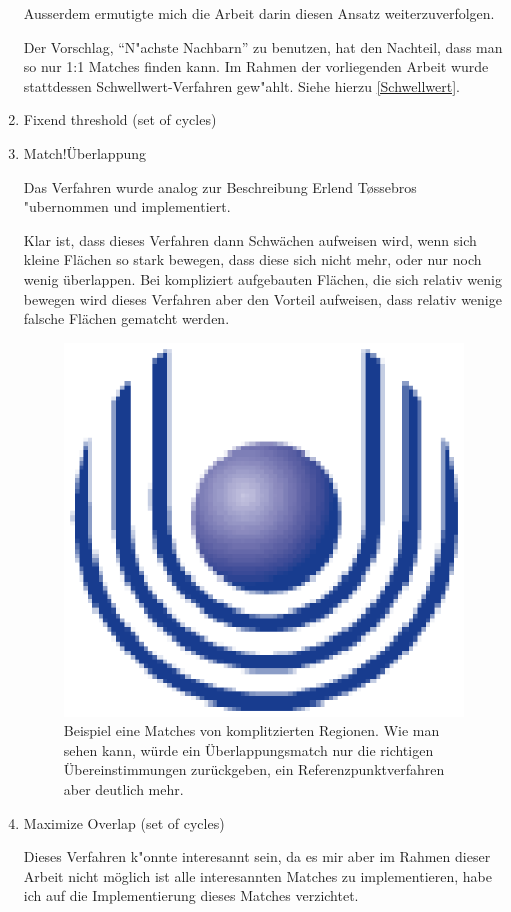 \begin{enumerate}
Ausserdem ermutigte mich die Arbeit \cite{AFRW} darin diesen Ansatz weiterzuverfolgen.

Der Vorschlag, "`N"achste Nachbarn"' zu benutzen, hat den Nachteil, dass man so nur 1:1 Matches finden kann. Im Rahmen der vorliegenden Arbeit wurde stattdessen Schwellwert-Verfahren gew"ahlt. Siehe hierzu \ref{Schwellwert}.

\item Fixend threshold (set of cycles)\item{Match!Überlappung}

Das Verfahren wurde analog zur Beschreibung Erlend T\o{}ssebros "ubernommen und implementiert. 

Klar ist, dass dieses Verfahren dann Schwächen aufweisen wird, wenn sich kleine Flächen so stark bewegen, dass diese sich nicht mehr, oder nur noch wenig überlappen. Bei kompliziert aufgebauten Flächen, die sich relativ wenig bewegen wird dieses Verfahren aber den Vorteil aufweisen, dass relativ wenige falsche Flächen gematcht werden.

\begin{figure}
	\centering
	\includegraphics{feu_logo2.eps}
	\caption[Beispiel für den Vorteil des Overlaping-Match]{Beispiel eine Matches von komplitzierten Regionen. Wie man sehen kann, würde ein Überlappungsmatch nur die richtigen Übereinstimmungen zurückgeben, ein Referenzpunktverfahren aber deutlich mehr.}
	\label{fig:OverlapVorteil}
\end{figure}


\item Maximize Overlap (set of cycles)

Dieses Verfahren k"onnte interesannt sein, da es mir aber im  Rahmen dieser Arbeit nicht möglich ist alle interesannten Matches zu implementieren, habe ich auf die Implementierung dieses Matches verzichtet.

\end{enumerate}

